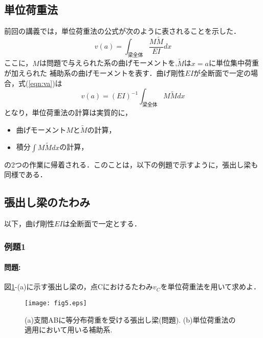 ﻿\documentclass[10pt,a4j]{jarticle}
\begin{document}
\subsection{単位荷重法}
前回の講義では，単位荷重法の公式が次のように表されることを示した．
\begin{equation}
	v(a)=\int_{梁全体} \frac{M\tilde M}{EI}dx
	\label{eqn:va}
\end{equation}
ここに，$M$は問題で与えられた系の曲げモーメントを,$\tilde M$は$x=a$に単位集中荷重が加えられた
補助系の曲げモーメントを表す．曲げ剛性$EI$が全断面で一定の場合，式(\ref{eqn:va})は
\begin{equation}
	v(a)=(EI)^{-1}\int_{梁全体} M\tilde Mdx
	\label{eqn:va2}
\end{equation}
となり，単位荷重法の計算は実質的に，
\begin{itemize}
\item
	曲げモーメント$M$と$\tilde M$の計算，
\item
	積分$\int M\tilde M dx$の計算，
\end{itemize}	
の2つの作業に帰着される．このことは，以下の例題で示すように，張出し梁も同様である．
\subsection{張出し梁のたわみ}
以下，曲げ剛性$EI$は全断面で一定とする．
\subsubsection{例題1}
\paragraph{問題:}
図\ref{fig:fig2_5}-(a)に示す張出し梁の，点Cにおけるたわみ$v_C$を単位荷重法を用いて求めよ．
\begin{figure}[h]
	\begin{center}
	\texttt{[image: fig5.eps]} 
	\end{center}
	\caption{(a)支間ABに等分布荷重を受ける張出し梁(問題).
	 (b)単位荷重法の適用において用いる補助系.} 
	\label{fig:fig2_5}
\end{figure}
\end{document}
